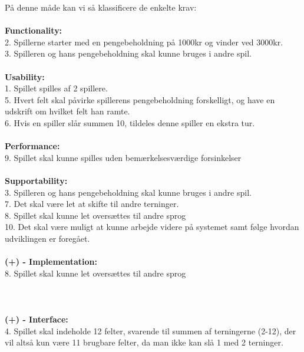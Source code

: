 \noindent På denne måde kan vi så klassificere de enkelte krav:
\\\\\textbf{Functionality:}
\\ 2. Spillerne starter med en pengebeholdning på 1000kr og vinder ved 3000kr.
\\ 3. Spilleren og hans pengebeholdning skal kunne bruges i andre spil.
\\\\\textbf{Usability:}
\\1. Spillet spilles af 2 spillere.
\\ 5. Hvert felt skal påvirke spillerens pengebeholdning forskelligt, og have en udskrift om hvilket felt han ramte.
\\ 6. Hvis en spiller slår summen 10, tildeles denne spiller en ekstra tur.
\\\\\textbf{Performance:}
\\9. Spillet skal kunne spilles uden bemærkelsesværdige forsinkelser
\\\\\textbf{Supportability:}
\\ 3. Spilleren og hans pengebeholdning skal kunne bruges i andre spil.
\\ 7. Det skal være let at skifte til andre terninger.
\\ 8. Spillet skal kunne let oversættes til andre sprog
\\ 10. Det skal være muligt at kunne arbejde videre på systemet samt følge hvordan udviklingen er foregået.
\\\\\textbf{(+) - Implementation:}
\\ 8. Spillet skal kunne let oversættes til andre sprog
\\\\\\\\\textbf{(+) - Interface:}
\\ 4. Spillet skal indeholde 12 felter, svarende til summen af terningerne (2-12), der vil altså kun være 11 brugbare felter, da man ikke kan slå 1 med 2 terninger.

